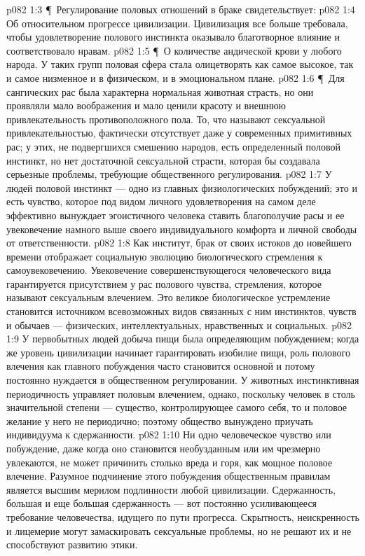 \vs p082 1:3 \P\ Регулирование половых отношений в браке свидетельствует:
\vs p082 1:4 \bibnobreakspace Об относительном прогрессе цивилизации. Цивилизация все больше требовала, чтобы удовлетворение полового инстинкта оказывало благотворное влияние и соответствовало нравам.
\vs p082 1:5 \P\ \bibnobreakspace О количестве андической крови у любого народа. У таких групп половая сфера стала олицетворять как самое высокое, так и самое низменное и в физическом, и в эмоциональном плане.
\vs p082 1:6 \P\ Для сангических рас была характерна нормальная животная страсть, но они проявляли мало воображения и мало ценили красоту и внешнюю привлекательность противоположного пола. То, что называют сексуальной привлекательностью, фактически отсутствует даже у современных примитивных рас; у этих, не подвергшихся смешению народов, есть определенный половой инстинкт, но нет достаточной сексуальной страсти, которая бы создавала серьезные проблемы, требующие общественного регулирования.
\vs p082 1:7 У людей половой инстинкт --- одно из главных физиологических побуждений; это и есть чувство, которое под видом личного удовлетворения на самом деле эффективно вынуждает эгоистичного человека ставить благополучие расы и ее увековечение намного выше своего индивидуального комфорта и личной свободы от ответственности.
\vs p082 1:8 Как институт, брак от своих истоков до новейшего времени отображает социальную эволюцию биологического стремления к самоувековечению. Увековечение совершенствующегося человеческого вида гарантируется присутствием у рас полового чувства, стремления, которое называют сексуальным влечением. Это великое биологическое устремление становится источником всевозможных видов связанных с ним инстинктов, чувств и обычаев --- физических, интеллектуальных, нравственных и социальных.
\vs p082 1:9 У первобытных людей добыча пищи была определяющим побуждением; когда же уровень цивилизации начинает гарантировать изобилие пищи, роль полового влечения как главного побуждения часто становится основной и потому постоянно нуждается в общественном регулировании. У животных инстинктивная периодичность управляет половым влечением, однако, поскольку человек в столь значительной степени --- существо, контролирующее самого себя, то и половое желание у него не периодично; поэтому общество вынуждено приучать индивидуума к сдержанности.
\vs p082 1:10 Ни одно человеческое чувство или побуждение, даже когда оно становится необузданным или им чрезмерно увлекаются, не может причинить столько вреда и горя, как мощное половое влечение. Разумное подчинение этого побуждения общественным правилам является высшим мерилом подлинности любой цивилизации. Сдержанность, большая и еще большая сдержанность --- вот постоянно усиливающееся требование человечества, идущего по пути прогресса. Скрытность, неискренность и лицемерие могут замаскировать сексуальные проблемы, но не решают их и не способствуют развитию этики.
